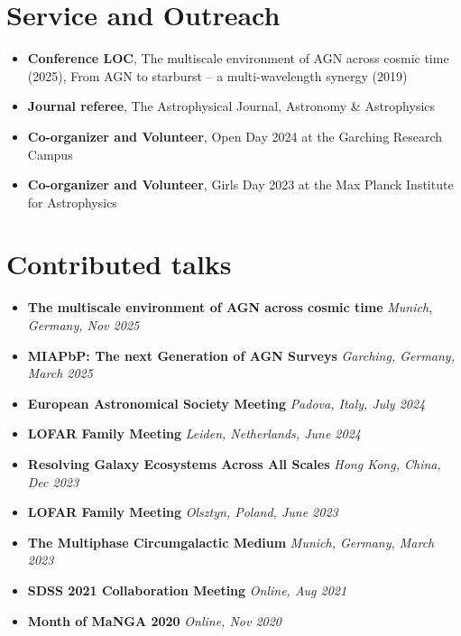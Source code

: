\documentclass[12pt,a4paper]{article}
\begin{document}
\section*{Service and Outreach}

\begin{itemize}[leftmargin=*, itemsep=2pt]
  \item \textbf{Conference LOC}, The multiscale environment of AGN across cosmic time (2025), From AGN to starburst -- a multi-wavelength synergy (2019)
  \item \textbf{Journal referee}, The Astrophysical Journal, Astronomy \& Astrophysics
  \item \textbf{Co-organizer and Volunteer}, Open Day 2024 at the Garching Research Campus
  \item \textbf{Co-organizer and Volunteer}, Girls Day 2023 at the Max Planck Institute for Astrophysics
\end{itemize}


\section*{Contributed talks}

\begin{itemize}[leftmargin=*, itemsep=4pt, parsep=0pt]

  \item \textbf{The multiscale environment of AGN across cosmic time} \hfill \textit{Munich, Germany, Nov 2025}

  \item \textbf{MIAPbP: The next Generation of AGN Surveys} \hfill \textit{Garching, Germany, March 2025}
  
  \item \textbf{European Astronomical Society Meeting} \hfill \textit{Padova, Italy, July 2024}

  \item \textbf{LOFAR Family Meeting} \hfill \textit{Leiden, Netherlands, June 2024}

  \item \textbf{Resolving Galaxy Ecosystems Across All Scales} \hfill \textit{Hong Kong, China, Dec 2023}
  
  \item \textbf{LOFAR Family Meeting} \hfill \textit{Olsztyn, Poland, June 2023} 

  \item \textbf{The Multiphase Circumgalactic Medium} \hfill \textit{Munich, Germany, March 2023} 

  \item \textbf{SDSS 2021 Collaboration Meeting} \hfill \textit{Online, Aug 2021} 

  \item \textbf{Month of MaNGA 2020} \hfill \textit{Online, Nov 2020} 
  
\end{itemize}
\end{document}
